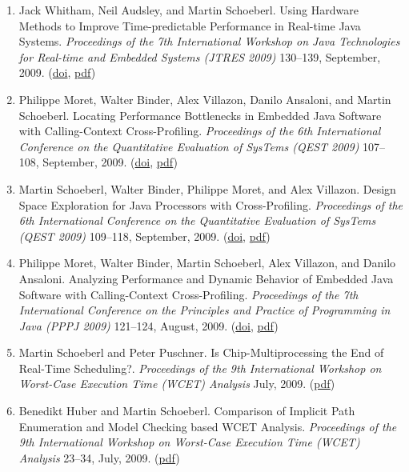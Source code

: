 \begin{enumerate}
\item Jack Whitham, Neil Audsley, and Martin Schoeberl.
 Using Hardware Methods to Improve Time-predictable Performance in Real-time Java Systems.
 \emph{Proceedings of the 7th International Workshop on Java Technologies for Real-time and Embedded Systems (JTRES 2009)} 130--139, September, 2009.
(\href{http://dx.doi.org/10.1145/1620405.1620424}{doi}, \href{http://www.jopdesign.com/doc/hwmethods.pdf}{pdf})

\item Philippe Moret, Walter Binder, Alex Villazon, Danilo Ansaloni, and Martin Schoeberl.
 Locating Performance Bottlenecks in Embedded Java Software with Calling-Context Cross-Profiling.
 \emph{Proceedings of the 6th International Conference on the Quantitative Evaluation of SysTems (QEST 2009)} 107--108, September, 2009.
(\href{http://dx.doi.org/10.1109/QEST.2009.40}{doi}, \href{http://www.jopdesign.com/doc/qest09_demo.pdf}{pdf})

\item Martin Schoeberl, Walter Binder, Philippe Moret, and Alex Villazon.
 Design Space Exploration for Java Processors with Cross-Profiling.
 \emph{Proceedings of the 6th International Conference on the Quantitative Evaluation of SysTems (QEST 2009)} 109--118, September, 2009.
(\href{http://dx.doi.org/10.1109/QEST.2009.15}{doi}, \href{http://www.jopdesign.com/doc/profarch_qest2009.pdf}{pdf})

\item Philippe Moret, Walter Binder, Martin Schoeberl, Alex Villazon, and Danilo Ansaloni.
 Analyzing Performance and Dynamic Behavior of Embedded Java Software with Calling-Context Cross-Profiling.
 \emph{Proceedings of the 7th International Conference on the Principles and Practice of Programming in Java (PPPJ 2009)} 121--124, August, 2009.
(\href{http://dx.doi.org/10.1145/1596655.1596674}{doi}, \href{http://www.jopdesign.com/doc/pppj09-cprof.pdf}{pdf})

\item Martin Schoeberl and Peter Puschner.
 Is Chip-Multiprocessing the End of Real-Time Scheduling?.
 \emph{Proceedings of the 9th International Workshop on Worst-Case Execution Time (WCET) Analysis} July, 2009.
(\href{http://www.jopdesign.com/doc/cmp_wcet2009.pdf}{pdf})

\item Benedikt Huber and Martin Schoeberl.
 Comparison of Implicit Path Enumeration and Model Checking based WCET Analysis.
 \emph{Proceedings of the 9th International Workshop on Worst-Case Execution Time (WCET) Analysis} 23--34, July, 2009.
(\href{http://www.jopdesign.com/doc/wcetmc_wcet2009.pdf}{pdf})


\end{enumerate}
